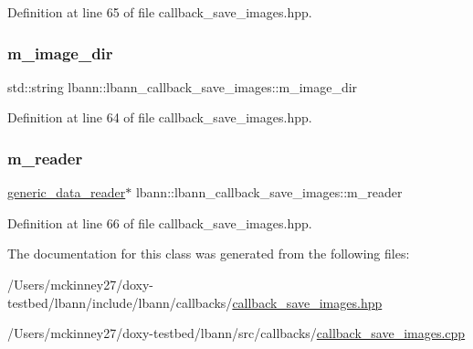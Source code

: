 Definition at line 65 of file callback\+\_\+save\+\_\+images.\+hpp.

\mbox{\label{classlbann_1_1lbann__callback__save__images_aeb69e2814c78d33a93b9ddc276c4cc57}} 
\subsubsection{\texorpdfstring{m\+\_\+image\+\_\+dir}{m\_image\_dir}}
{\footnotesize\ttfamily std\+::string lbann\+::lbann\+\_\+callback\+\_\+save\+\_\+images\+::m\+\_\+image\+\_\+dir\hspace{0.3cm}{\ttfamily [private]}}



Definition at line 64 of file callback\+\_\+save\+\_\+images.\+hpp.

\mbox{\label{classlbann_1_1lbann__callback__save__images_a275e409b2b2f3ebe2baeea636e18c607}} 
\subsubsection{\texorpdfstring{m\+\_\+reader}{m\_reader}}
{\footnotesize\ttfamily \hyperlink{classlbann_1_1generic__data__reader}{generic\+\_\+data\+\_\+reader}$\ast$ lbann\+::lbann\+\_\+callback\+\_\+save\+\_\+images\+::m\+\_\+reader\hspace{0.3cm}{\ttfamily [private]}}



Definition at line 66 of file callback\+\_\+save\+\_\+images.\+hpp.



The documentation for this class was generated from the following files\+:\begin{DoxyCompactItemize}
\item 
/\+Users/mckinney27/doxy-\/testbed/lbann/include/lbann/callbacks/\hyperlink{callback__save__images_8hpp}{callback\+\_\+save\+\_\+images.\+hpp}\item 
/\+Users/mckinney27/doxy-\/testbed/lbann/src/callbacks/\hyperlink{callback__save__images_8cpp}{callback\+\_\+save\+\_\+images.\+cpp}\end{DoxyCompactItemize}
